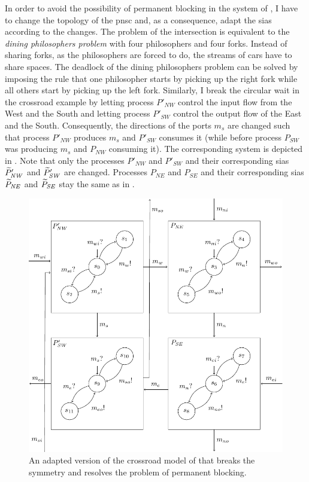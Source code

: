 In order to avoid the possibility of permanent blocking in the system of \Fig{\ref{fig_cross_proc_sia_dl}}, I have to change the topology of the \gls{pnsc} and, as a consequence, adapt the \glspl{sia} according to the changes.
The problem of the intersection is equivalent to the \emph{dining philosophers problem} with four philosophers and four forks.
Instead of sharing forks, as the philosophers are forced to do, the streams of cars have to share spaces.
The deadlock of the dining philosophers problem can be solved by imposing the rule that one philosopher starts by picking up the right fork while all others start by picking up the left fork.
Similarly, I break the circular wait in the crossroad example by letting process $P'_{\mathit{NW}}$ control the input flow from the West and the South and letting process $P'_{\mathit{SW}}$ control the output flow of the East and the South.
Consequently, the directions of the ports $m_s$ are changed such that process $P'_{\mathit{NW}}$ produces $m_s$ and $P'_{\mathit{SW}}$ consumes it (while before process $P_{\mathit{SW}}$ was producing $m_s$ and $P_{\mathit{NW}}$ consuming it).
The corresponding system is depicted in \Fig{\ref{fig_cross_proc_sia}}.
Note that only the processes $P'_{\mathit{NW}}$ and $P'_{\mathit{SW}}$ and their corresponding \glspl{sia} $\widetilde{P}'_{\mathit{NW}}$ and $\widetilde{P}'_{\mathit{SW}}$ are changed.
Processes $P_{\mathit{NE}}$ and $P_{\mathit{SE}}$ and their corresponding \glspl{sia} $\widetilde{P}_{\mathit{NE}}$ and $\widetilde{P}_{\mathit{SE}}$ stay the same as in \Fig{\ref{fig_cross_proc_sia_dl}}.
\begin{figure}[bht]
    \TopFigSpace
    \centering
    \includegraphics[width=12cm]{fig/cross_proc_sia.pdf}
    \CaptionFigSpace
    \caption{An adapted version of the crossroad model of \Fig{\ref{fig_cross_proc_sia_dl}} that breaks the symmetry and resolves the problem of permanent blocking.}
    \label{fig_cross_proc_sia}
    \BotFigSpace
\end{figure}

